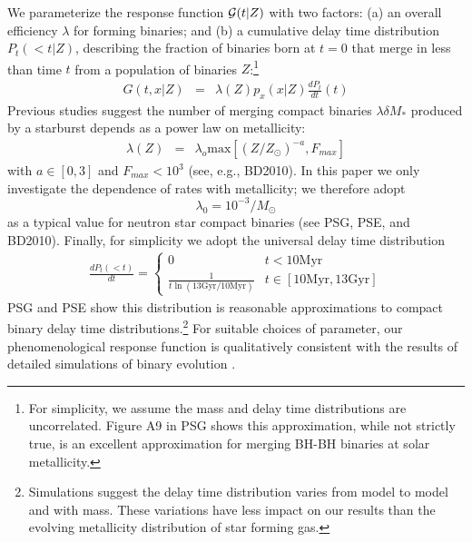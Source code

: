 \documentclass[nofootinbib,twocolumn,prd]{emulateapj}
\newcommand\unit[1]{\text{#1}}
\newcommand\abbrvPSgrb{PSG}
\newcommand\abbrvPSellipticals{PSE}
\newcommand\abbrvKBLowZa{BD2010}
\begin{document}
We parameterize the response function ${\cal G}(t|Z)$ with two factors: (a) an overall efficiency $\lambda$ for forming
binaries;  and (b) a
cumulative delay time distribution $P_t(<t|Z)$, describing the fraction of binaries born at $t=0$ that merge in less
than time $t$ from a population of binaries $Z$:\footnote{For simplicity, we assume the mass and delay time
  distributions are uncorrelated.  Figure A9 in \abbrvPSgrb{} shows this approximation, while not strictly true, is an
  excellent approximation for merging BH-BH binaries at solar metallicity.  }
\begin{eqnarray}
G(t,x|Z) &=& \lambda(Z) p_x(x|Z) \frac{dP_t}{dt}(t) 
\end{eqnarray}
Previous studies suggest the number of merging compact binaries $\lambda \delta M_*$ produced by a starburst depends
as a power law on metallicity:
\begin{eqnarray}
\label{eq:LambdaVersusZModel}
\lambda(Z) &=& \lambda_o \text{max}[(Z/Z_\odot)^{-a}, F_{max}] 
\end{eqnarray}
with $a\in [0,3]$ and $F_{max}<10^3$
 (see, e.g.\cite{popsyn-LIGO-SFR-2008}, \abbrvKBLowZa).
In this paper we only investigate the dependence of rates with metallicity; we therefore  adopt 
\[
\lambda_0 = 10^{-3}/M_\odot
\]
as a typical value for neutron star compact binaries (see \abbrvPSgrb{}, \abbrvPSellipticals, and \abbrvKBLowZa).
%
Finally, for simplicity we adopt the universal delay time distribution
\begin{eqnarray}
\frac{dP_t(<t)}{dt} =  \begin{cases}
0 & t<10 \unit{Myr} \\
\frac{1}{t \ln (13 \unit{Gyr}/10\unit{Myr})} & t \in [10\unit{Myr},13\unit{Gyr}]
\end{cases} 
\end{eqnarray}
\abbrvPSgrb{} and \abbrvPSellipticals{} show this distribution is reasonable approximations to compact binary delay
time distributions.\footnote{Simulations suggest the delay time distribution varies from model to model and with mass.
  These variations have less impact on our results than the evolving metallicity distribution of star forming gas.}
%
For suitable choices of parameter, our phenomenological response function is qualitatively consistent with the results of detailed simulations of binary
evolution  \citep{2010ApJ...715L.138B,popsyn-LowMetallicityImpact2c-StarTrackRevised-2014,popsyn-LowMetallicityImpact2b-StarTrackRevised-2013,popsyn-LowMetallicityImpact2-StarTrackRevised-2012}.
\end{document}
